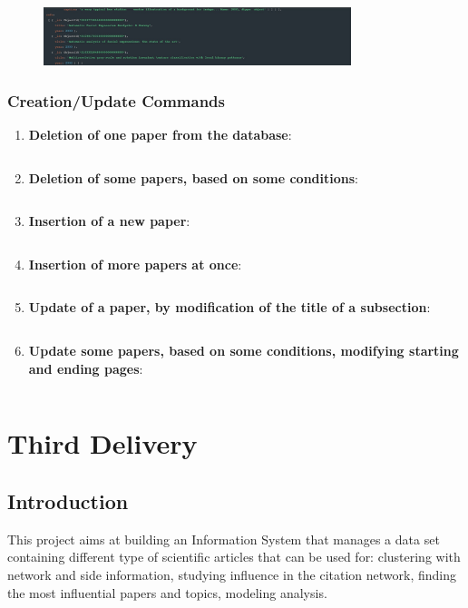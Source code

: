 \documentclass{Configuration_Files/PoliMi3i_thesis}
\begin{document}
\begin{enumerate}
\begin{figure}[H]
        \includegraphics[width=0.8\textwidth]{Images/queries_mongodb/query_11_5.jpg}
    \end{figure}
    
\end{enumerate}

\subsection{Creation/Update Commands}
\begin{enumerate}
    \item \textbf{Deletion of one paper from the database}:
    \inputminted[linenos,tabsize=2,breaklines]{MQL}{code/commands_mongodb/cmd_1.txt}
    \item \textbf{Deletion of some papers, based on some conditions}:
    \inputminted[linenos,tabsize=2,breaklines]{MQL}{code/commands_mongodb/cmd_2.txt}
    \item \textbf{Insertion of a new paper}:
    \inputminted[linenos,tabsize=2,breaklines]{MQL}{code/commands_mongodb/cmd_3.txt}
    \item \textbf{Insertion of more papers at once}:
    \inputminted[linenos,tabsize=2,breaklines]{MQL}{code/commands_mongodb/cmd_4.txt}
    \item \textbf{Update of a paper, by modification of the title of a subsection}:
    \inputminted[linenos,tabsize=2,breaklines]{MQL}{code/commands_mongodb/cmd_5.txt}
    \item \textbf{Update some papers, based on some conditions, modifying starting and ending pages}:
    \inputminted[linenos,tabsize=2,breaklines]{MQL}{code/commands_mongodb/cmd_6.txt}
\end{enumerate}

\chapter{Third Delivery}

\section{Introduction}
\label{se:probdes1}
This project aims at building an Information System that manages a data set containing different type of scientific articles that can be used for: clustering with network and side information, studying influence in the citation network, finding the most influential papers and topics, modeling analysis.
\end{document}
